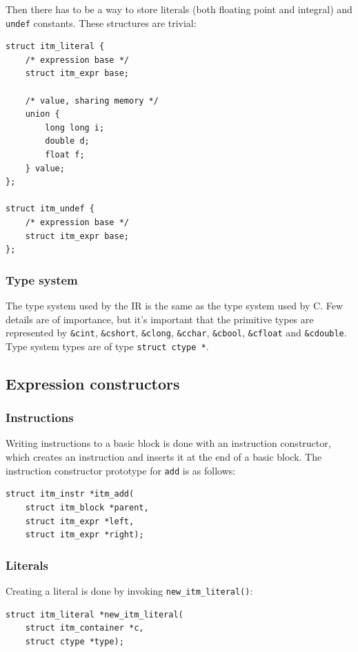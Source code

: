 \documentclass[12pt, a4paper]{article}
\begin{document}
Then there has to be a way to store literals (both floating point and integral)
and \verb+undef+ constants. These structures are trivial:

\begin{lstlisting}
struct itm_literal {
	/* expression base */
	struct itm_expr base;

	/* value, sharing memory */
	union {
		long long i;
		double d;
		float f;
	} value;
};

struct itm_undef {
	/* expression base */
	struct itm_expr base;
};
\end{lstlisting}

\subsubsection{Type system}
The type system used by the IR is the same as the type system used by C. Few
details are of importance, but it's important that the primitive types are
represented by \verb+&cint+, \verb+&cshort+, \verb+&clong+, \verb+&cchar+,
\verb+&cbool+, \verb+&cfloat+ and \verb+&cdouble+. Type system types are of type
\verb+struct ctype *+.

\subsection{Expression constructors}
\subsubsection{Instructions}
Writing instructions to a basic block is done with an instruction constructor,
which creates an instruction and inserts it at the end of a basic block. The
instruction constructor prototype for \verb+add+ is as follows:

\begin{lstlisting}
struct itm_instr *itm_add(
	struct itm_block *parent,
	struct itm_expr *left,
	struct itm_expr *right);
\end{lstlisting}

\subsubsection{Literals}
Creating a literal is done by invoking \verb+new_itm_literal()+:

\begin{lstlisting}
struct itm_literal *new_itm_literal(
	struct itm_container *c,
	struct ctype *type);
\end{lstlisting}
\end{document}
